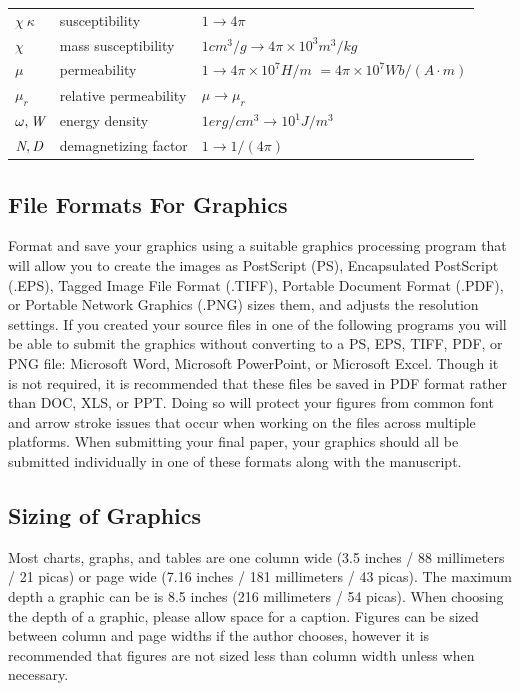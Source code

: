 \documentclass[journal]{IEEEtranTIE}
\begin{document}
\begin{table}[!t]
{\begin{tabular}{l l l}
			$ \chi \ \kappa $ & susceptibility & $ 1 \rightarrow 4\pi $ \\
			$ \chi  $ & mass susceptibility & $ 1 cm^3/g \rightarrow 4\pi \times 10^{3} m^3/kg $ \\
			\pbox{20cm}{$ \mu $ \\ \hphantom{1}} & \pbox{20cm}{permeability \\ \hphantom{1}} & \pbox{20cm}{$ 1 \rightarrow 4\pi \times 10^{7} H/m $ \\ \hphantom{1} $ =4\pi \times 10^{7} Wb/(A \cdot m) $ } \\
			$ \mu_r $ & relative permeability & $ \mu \rightarrow \mu_r $ \\
			$ \omega, \emph{W} $ & energy density & $ 1 erg/cm^3 \rightarrow 10^1 J/m^3 $ \\
			$ \emph{N}, \emph{D} $ & demagnetizing factor & $ 1 \rightarrow 1/(4\pi) $ \\ [1.4ex]
			\hline\hline
		\end{tabular}
	}
\end{table}

\subsection{File Formats For Graphics}

Format and save your graphics using a suitable graphics processing program that will allow you to create the images as PostScript (PS), Encapsulated PostScript (.EPS), Tagged Image File Format (.TIFF), Portable Document Format (.PDF), or Portable Network Graphics (.PNG) sizes them, and adjusts the resolution settings. If you created your source files in one of the following programs you will be able to submit the graphics without converting to a PS, EPS, TIFF, PDF, or PNG file: Microsoft Word, Microsoft PowerPoint, or Microsoft Excel. Though it is not required, it is recommended that these files be saved in PDF format rather than DOC, XLS, or PPT. Doing so will protect your figures from common font and arrow stroke issues that occur when working on the files across multiple platforms. When submitting your final paper, your graphics should all be submitted individually in one of these formats along with the manuscript.


\subsection{Sizing of Graphics}

Most charts, graphs, and tables are one column wide (3.5 inches / 88 millimeters / 21 picas) or page wide (7.16 inches / 181 millimeters / 43 picas). The maximum depth a graphic can be is 8.5 inches (216 millimeters / 54 picas). When choosing the depth of a graphic, please allow space for a caption. Figures can be sized between column and page widths if the author chooses, however it is recommended that figures are not sized less than column width unless when necessary.
\end{document}
